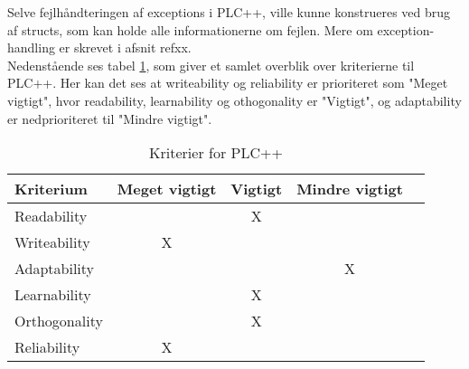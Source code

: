 Selve fejlhåndteringen af exceptions i PLC++, ville kunne konstrueres ved brug af structs, som kan holde alle informationerne om fejlen. Mere om exception-handling er skrevet i afsnit refxx. \\

\noindent Nedenstående ses tabel \ref{table:kriterier}, som giver et samlet overblik over kriterierne til PLC++. Her kan det ses at writeability og reliability er prioriteret som "Meget vigtigt", hvor readability, learnability og othogonality er "Vigtigt", og adaptability er nedprioriteret til "Mindre vigtigt".

\begin{table}[H]
\centering
\begin{tabular}{l c c c c}
\toprule
\textbf{Kriterium} & \textbf{Meget vigtigt} & \textbf{Vigtigt} & \textbf{Mindre vigtigt}  \\ \midrule
Readability        &   & X &       \\ 
Writeability       & X &   &       \\ 
Adaptability       &   &   & X     \\ 
Learnability       &   & X &       \\ 
Orthogonality      &   & X &       \\ 
Reliability        & X &   &       \\ \bottomrule
\end{tabular}
\caption{Kriterier for PLC++}
\label{table:kriterier}
\end{table}






